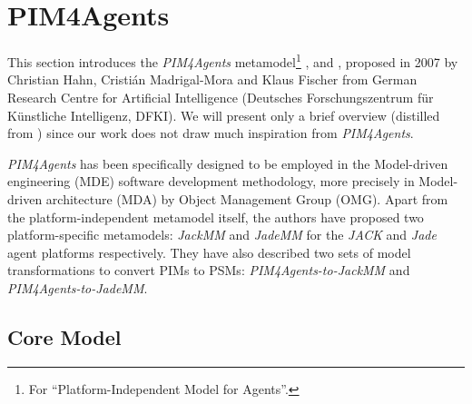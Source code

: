 
\section{PIM4Agents}

This section introduces the \textit{PIM4Agents} metamodel\footnote{For ``Platform-Independent Model for Agents''.} \cite{Hahn07a}, \cite{Hahn07b} and \cite{Hahn08}, proposed in 2007 by Christian Hahn, Cristián Madrigal-Mora and Klaus Fischer from German Research Centre for Artificial Intelligence (Deutsches Forschungszentrum f\"{u}r K\"{u}nstliche Intelligenz, DFKI).
We will present only a brief overview (distilled from \cite{Hahn07b}) since our work does not draw much inspiration from \textit{PIM4Agents}.


\textit{PIM4Agents} has been specifically designed to be employed in the Model-driven engineering (MDE) software development methodology, more precisely in Model-driven architecture (MDA) by Object Management Group (OMG).
Apart from the platform-independent metamodel itself, the authors have proposed two platform-specific metamodels: \textit{JackMM} and \textit{JadeMM} for the \textit{JACK} and \textit{Jade} agent platforms respectively.
They have also described two sets of model transformations to convert PIMs to PSMs: \textit{PIM4Agents-to-JackMM} and \textit{PIM4Agents-to-JadeMM}.

\subsection*{Core Model}

